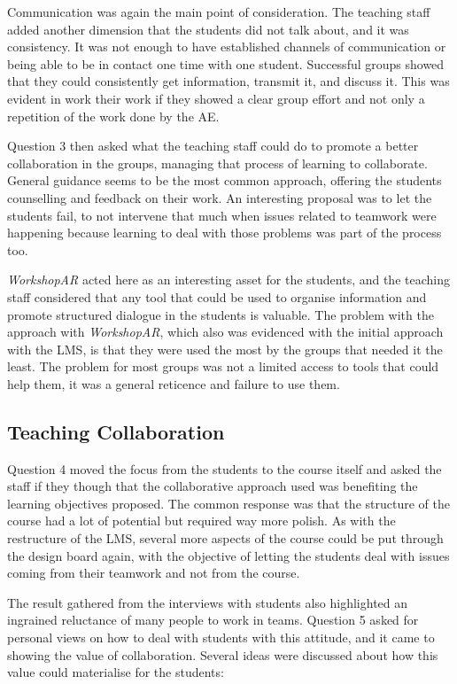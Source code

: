 Communication was again the main point of consideration. The teaching staff added another dimension that the students did not talk about, and it was consistency. It was
not enough to have established channels of communication or being able to be in contact one time with one student. Successful groups showed that they could consistently
get information, transmit it, and discuss it. This was evident in work their work if they showed a clear group effort and not only a repetition of the work done by the \ac{AE}.

Question 3 then asked what the teaching staff could do to promote a better collaboration in the groups, managing that process of learning to collaborate. General guidance
seems to be the most common approach, offering the students counselling and feedback on their work. An interesting proposal was to let the students fail, to not intervene
that much when issues related to teamwork were happening because learning to deal with those problems was part of the process too.

\emph{WorkshopAR} acted here as an interesting asset for the students, and the teaching staff considered that any tool that could be used to organise information and
promote structured dialogue in the students is valuable. The problem with the approach with \emph{WorkshopAR}, which also was evidenced with the initial approach with the
\ac{LMS}, is that they were used the most by the groups that needed it the least. The problem for most groups was not a limited access to tools that could help them, it
was a general reticence and failure to use them.

\subsection{Teaching Collaboration \label{sec:6-10-2}}

Question 4 moved the focus from the students to the course itself and asked the staff if they though that the collaborative approach used was benefiting the learning
objectives proposed. The common response was that the structure of the course had a lot of potential but required way more polish. As with the restructure of the \ac{LMS},
several more aspects of the course could be put through the design board again, with the objective of letting the students deal with issues coming from their teamwork and
not from the course.

The result gathered from the interviews with students also highlighted an ingrained reluctance of many people to work in teams. Question 5 asked for personal views on how
to deal with students with this attitude, and it came to showing the value of collaboration. Several ideas were discussed about how this value could materialise for the
students:

